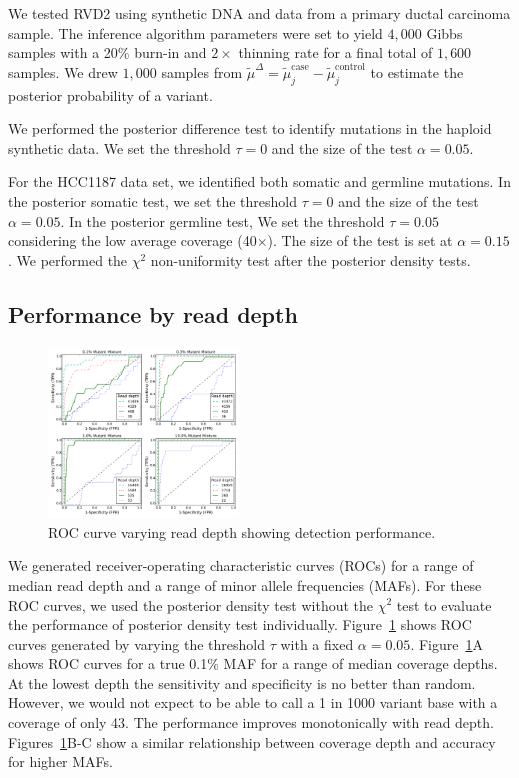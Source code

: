 \documentclass{bioinfo}
\begin{document}
We tested RVD2 using synthetic DNA and data from a primary ductal carcinoma sample. The inference algorithm parameters were set to yield $4,000$ Gibbs samples with a 20\% burn-in and $2\times$ thinning rate for a final total of $1,600$ samples. We drew $1,000$ samples from $ \tilde{\mu}^{\Delta} =  \tilde{\mu}_j^{\text{case}} - \tilde{\mu}_j^{\text{control}}$ to estimate the posterior probability of a variant.

We performed the posterior difference test to identify mutations in the haploid synthetic data. We set the threshold $ \tau =0 $ and the size of the test $ \alpha = 0.05$.

For the HCC1187 data set, we identified both somatic and germline mutations. In the posterior somatic test, we set the threshold $ \tau =0 $ and the size of the test $ \alpha = 0.05$. In the posterior germline test, We set  the threshold $ \tau =0.05 $ considering the low average coverage (40$\times$). The size of the test is set at $ \alpha = 0.15$. We performed the $\chi^2$ non-uniformity test after the posterior density tests.

\subsection{Performance by read depth}\label{sec:read_depth}

\begin{figure}[htbp]
\centering
\vspace{-15pt}
\includegraphics[width=0.45\textwidth]{pdf_figs/ROC_without_chi2.pdf}
\caption{ROC curve varying read depth showing detection performance. }
\vspace{-15pt}
\label{fig:ROC}
\end{figure}
We generated receiver-operating characteristic curves (ROCs) for a range of median read depth and a range of minor allele frequencies (MAFs). For these ROC curves, we used the posterior density test without the $\chi^2$ test to evaluate the performance of posterior density test individually. Figure~\ref{fig:ROC} shows ROC curves generated by varying the threshold $\tau$ with a fixed $\alpha=0.05$. Figure~\ref{fig:ROC}A shows ROC curves for a true 0.1\% MAF for a range of median coverage depths. At the lowest depth the sensitivity and specificity is no better than random. However, we would not expect to be able to call a 1 in 1000 variant base with a coverage of only 43. The performance improves monotonically with read depth. Figures~\ref{fig:ROC}B-C show a similar relationship between coverage depth and accuracy for higher MAFs.
\end{document}
